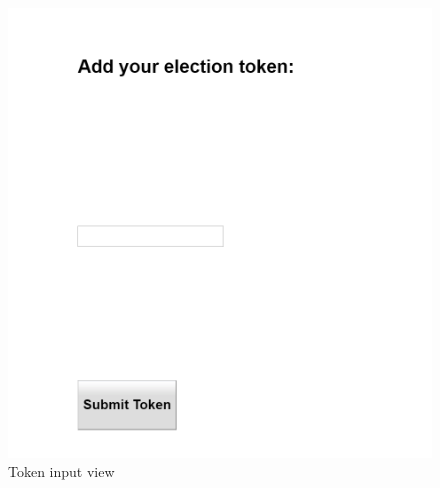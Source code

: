 \documentclass[a4paper]{scrreprt}
\begin{document}
\begin{figure}[H]
\centering
\includegraphics[width=\textwidth]{images/token_input.png}
\caption {Token input view}
\end{figure}
\end{document}
